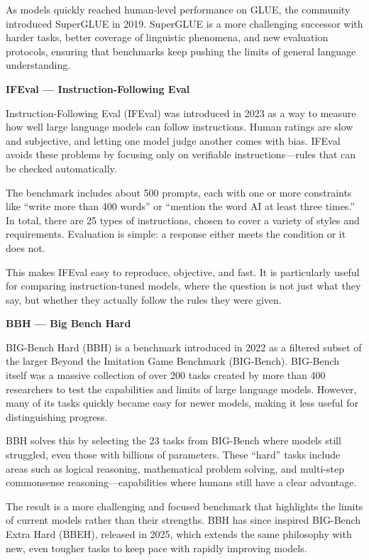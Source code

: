 As models quickly reached human-level performance on GLUE, the community introduced SuperGLUE in 2019. SuperGLUE is a more challenging successor
with harder tasks, better coverage of linguistic phenomena, and new evaluation protocols, ensuring that benchmarks keep pushing the limits of
general language understanding.

\textbf{IFEval — Instruction-Following Eval}


Instruction-Following Eval (IFEval) was introduced in 2023 as a way to measure how well large language models can follow instructions.
Human ratings are slow and subjective, and letting one model judge another comes with bias.
IFEval avoids these problems by focusing only on verifiable instructions—rules that can be checked automatically.

The benchmark includes about 500 prompts, each with one or more constraints like “write more than 400 words” or “mention the word AI at
least three times.” In total, there are 25 types of instructions, chosen to cover a variety of styles and requirements.
Evaluation is simple: a response either meets the condition or it does not.

This makes IFEval easy to reproduce, objective, and fast. It is particularly useful for comparing instruction-tuned models, where the question
is not just what they say, but whether they actually follow the rules they were given.

\textbf{BBH — Big Bench Hard}


BIG-Bench Hard (BBH) is a benchmark introduced in 2022 as a filtered subset of the larger Beyond the Imitation Game Benchmark (BIG-Bench).
BIG-Bench itself was a massive collection of over 200 tasks created by more than 400 researchers to test the capabilities and limits of large
language models. However, many of its tasks quickly became easy for newer models, making it less useful for distinguishing progress.

BBH solves this by selecting the 23 tasks from BIG-Bench where models still struggled, even those with billions of parameters. These “hard”
tasks include areas such as logical reasoning, mathematical problem solving, and multi-step commonsense reasoning—capabilities where humans still
have a clear advantage.

The result is a more challenging and focused benchmark that highlights the limits of current models rather than their strengths. BBH has since
inspired BIG-Bench Extra Hard (BBEH), released in 2025, which extends the same philosophy with new, even tougher tasks to keep pace with rapidly
improving models.

